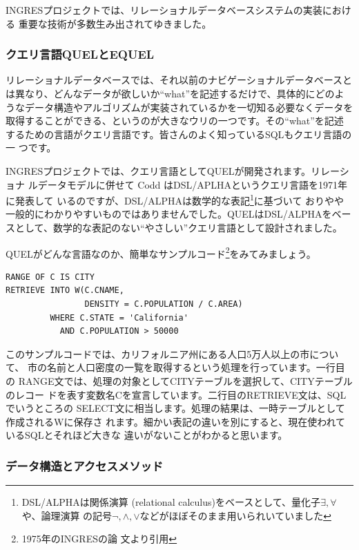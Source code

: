 INGRESプロジェクトでは、リレーショナルデータベースシステムの実装における
重要な技術が多数生み出されてゆきました。

\subsubsection{クエリ言語QUELとEQUEL}

リレーショナルデータベースでは、それ以前のナビゲーショナルデータベースと
は異なり、どんなデータが欲しいか``what''を記述するだけで、具体的にどのよ
うなデータ構造やアルゴリズムが実装されているかを一切知る必要なくデータを
取得することができる、というのが大きなウリの一つです。その``what''を記述
するための言語がクエリ言語です。皆さんのよく知っているSQLもクエリ言語の一
つです。

INGRESプロジェクトでは、クエリ言語としてQUELが開発されます。リレーショナ
ルデータモデルに併せて Codd はDSL/APLHAというクエリ言語を1971年に発表して
いるのですが、DSL/ALPHAは数学的な表記\footnote{DSL/ALPHAは関係演算
(relational calculus)をベースとして、量化子$\exists, \forall$や、論理演算
の記号$\lnot,\land,\lor$などがほぼそのまま用いられいていました}に基づいて
おりやや一般的にわかりやすいものではありませんでした。QUELはDSL/ALPHAをベー
スとして、数学的な表記のない``やさしい''クエリ言語として設計されました。

QUELがどんな言語なのか、簡単なサンプルコード\footnote{1975年のINGRESの論
文より引用}をみてみましょう。

\begin{center}
 \begin{minipage}{0.9\textwidth}
  \begin{verbatim}
RANGE OF C IS CITY
RETRIEVE INTO W(C.CNAME,
                DENSITY = C.POPULATION / C.AREA)
         WHERE C.STATE = 'California'
           AND C.POPULATION > 50000
  \end{verbatim}
 \end{minipage}
\end{center}

このサンプルコードでは、カリフォルニア州にある人口5万人以上の市について、
市の名前と人口密度の一覧を取得するという処理を行っています。一行目の
RANGE文では、処理の対象としてCITYテーブルを選択して、CITYテーブルのレコー
ドを表す変数名Cを宣言しています。二行目のRETRIEVE文は、SQLでいうところの
SELECT文に相当します。処理の結果は、一時テーブルとして作成されるWに保存さ
れます。細かい表記の違いを別にすると、現在使われているSQLとそれほど大きな
違いがないことがわかると思います。

\subsubsection{データ構造とアクセスメソッド}

